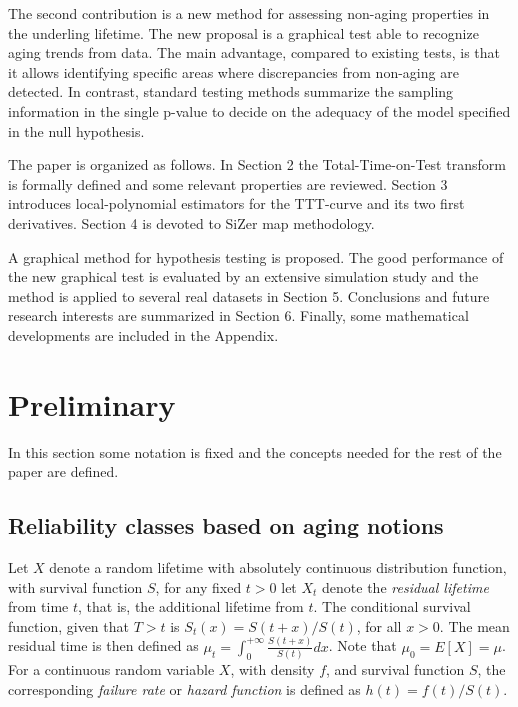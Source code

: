 \documentclass[preprint,12pt]{elsarticle}
\begin{document}
The second contribution is a new method for assessing non-aging properties in the underling lifetime. The new proposal is a graphical test able to recognize aging trends from data. The main advantage, compared to existing tests, is that it allows identifying specific areas where discrepancies from non-aging are detected. In contrast, standard testing methods summarize the sampling information in the single p-value to decide on the adequacy of the model specified in the null hypothesis.

The paper is organized as follows. In Section 2 the Total-Time-on-Test transform is formally defined and some relevant properties are reviewed. Section 3 introduces local-polynomial estimators for the TTT-curve and its two first derivatives. Section 4 is devoted to SiZer map methodology. 
 
A graphical method for hypothesis testing is proposed. The good performance of the new graphical test is evaluated by an extensive simulation study and the method is applied to several real datasets in Section 5. Conclusions and future research interests are summarized in Section 6. Finally, some mathematical developments are included in the Appendix.

\section{Preliminary}\label{sec:pre}
In this section some notation is fixed and the concepts needed for the rest of the paper are defined.

\subsection{Reliability classes based on aging notions}
Let $X$ denote a random lifetime with absolutely continuous distribution function, with survival function $S$, for any fixed $t>0$ let $X_t$ denote the \textit{residual lifetime} from time $t$, that is, the additional lifetime from $t$. The conditional survival function, given that $T>t$ is  $S_t(x)=S(t+x)/S(t)$, for all $x >0$. The mean residual time is then defined as $\mu_t= \int_0^{+\infty} \frac{S(t+x)}{S(t)}dx$. Note that $\mu_0=E[X]=\mu$. For a continuous random variable $X$, with density $f$, and survival function $S$, the corresponding \textit{failure rate} or \textit{hazard function} is defined as $h(t)=f(t)/S(t)$.
\end{document}

